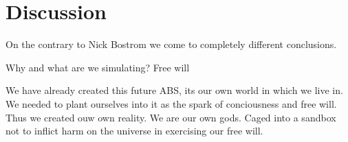\section{Discussion}

On the contrary to Nick Bostrom we come to completely different conclusions.

Why and what are we simulating? Free will

We have already created this future ABS, its our own world in which we live in. We needed to plant ourselves into it as the spark of conciousness and free will. Thus we created ouw own reality. We are our own gods. Caged into a sandbox not to inflict harm on the universe in exercising our free will.